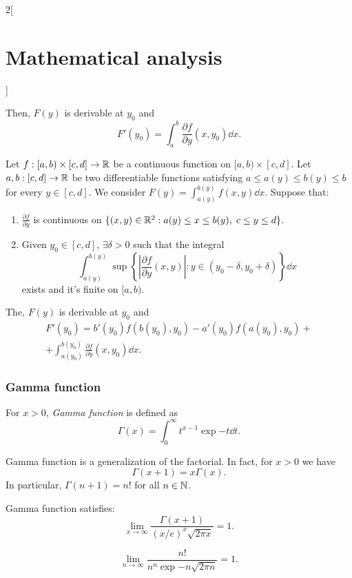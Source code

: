 \documentclass[../../../main.tex]{subfiles}
\begin{document}
\begin{multicols}{2}[\section{Mathematical analysis}]
\begin{theorem}
\begin{enumerate}
    \end{enumerate}
    Then, $F(y)$ is derivable at $y_0$ and $$F'(y_0)=\int_a^b\frac{\partial f}{\partial y}(x,y_0)\dd x.$$
  \end{theorem}
  \begin{theorem}
    Let $f:[a,b)\times[c,d]\rightarrow\mathbb{R} $ be a continuous function on $[a,b)\times[c,d]$. Let $a,b:[c,d]\rightarrow\mathbb{R} $ be two differentiable functions satisfying $a\leq a(y)\leq b(y)\leq b$ for every $y\in[c,d]$. We consider $\displaystyle F(y)=\int_{a(y)}^{b(y)}f(x,y)\dd x$. Suppose that:
    \begin{enumerate}
      \item $\displaystyle\frac{\partial f}{\partial y}$ is continuous on $\{(x,y)\in\mathbb{R} ^2:a(y)\leq x\leq b(y),\; c\leq y\leq d\}$.
      \item Given $y_0\in[c,d]$, $\exists\delta>0$ such that the integral $$\int_{a(y)}^{b(y)}\sup\left\{\left|\frac{\partial f}{\partial y}(x,y)\right|:y\in(y_0-\delta,y_0+\delta)\right\}\dd x$$ exists and it's finite on $[a,b)$.
    \end{enumerate}
    The, $F(y)$ is derivable at $y_0$ and \begin{multline*}
      F'(y_0)=b'(y_0)f(b(y_0),y_0)-a'(y_0)f(a(y_0),y_0)+\\+\int_{a(y_0)}^{b(y_0)}\frac{\partial f}{\partial y}(x,y_0)\dd x.
    \end{multline*}
  \end{theorem}
  \subsubsection{Gamma function}
  \begin{definition}
    For $x>0$, \textit{Gamma function} is defined as $$\Gamma(x)=\int_0^\infty t^{x-1}\exp{-t}\dd t.$$
  \end{definition}
  \begin{theorem}
    Gamma function is a generalization of the factorial. In fact, for $x>0$ we have $$\Gamma(x+1)=x\Gamma(x).$$ In particular, $\Gamma(n+1)=n!$ for all $n\in\mathbb{N} $.
  \end{theorem}
  \begin{theorem}
    Gamma function satisfies: $$\lim_{x\to\infty}\frac{\Gamma(x+1)}{(x/e)^x\sqrt{2\pi x}}=1.$$
  \end{theorem}
  \begin{corollary}
    $$\lim_{n\to\infty}\frac{n!}{n^n\exp{-n}\sqrt{2\pi n}}=1.$$
  \end{corollary}

\end{multicols}
\end{document}
